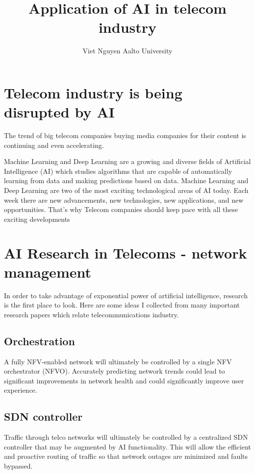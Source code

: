 \documentclass[12pt]{article}
\title{Application of AI in telecom industry}
\author{Viet Nguyen \newline Aalto University}
\date{}
\begin{document}
\maketitle
\tableofcontents
\clearpage

\section{Telecom industry is being disrupted by AI}
\noindent The trend of big telecom companies buying media companies for their content is continuing and even accelerating. %

\noindent Machine Learning and Deep Learning are a growing and diverse fields of Artificial Intelligence (AI) which studies algorithms that are capable of automatically learning from data and making predictions based on data. Machine Learning and Deep Learning are two of the most exciting technological areas of AI today. Each week there are new advancements, new technologies, new applications, and new opportunities. That's why Telecom companies should keep pace with all these exciting developments

\section{AI Research in Telecoms - network management}
\noindent In order to take advantage of exponential power of artificial intelligence, research is the first place to look. Here are some ideas I collected from many important research papers which relate telecommunications industry.
\subsection{Orchestration}
\noindent A fully NFV-enabled network will ultimately be controlled by a single NFV
orchestrator (NFVO). Accurately predicting network trends could lead to significant
improvements in network health and could significantly improve user experience.
\subsection{SDN controller}
\noindent Traffic through telco networks will ultimately be controlled by a centralized
SDN controller that may be augmented by AI functionality. This will allow the efficient and
proactive routing of traffic so that network outages are minimized and faults bypassed.
\end{document}

